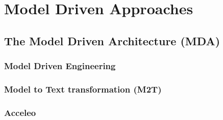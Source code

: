 \section{Model Driven Approaches}
\label{ModelDrivenApproaches}

\subsection{The Model Driven Architecture (MDA)}
\label{MDA}

\subsubsection{Model Driven Engineering}
\label{MDE}
\subsubsection{Model to Text transformation (M2T)}
\label{M2T}
\subsubsection{Acceleo}
\label{Accelelo}


 
